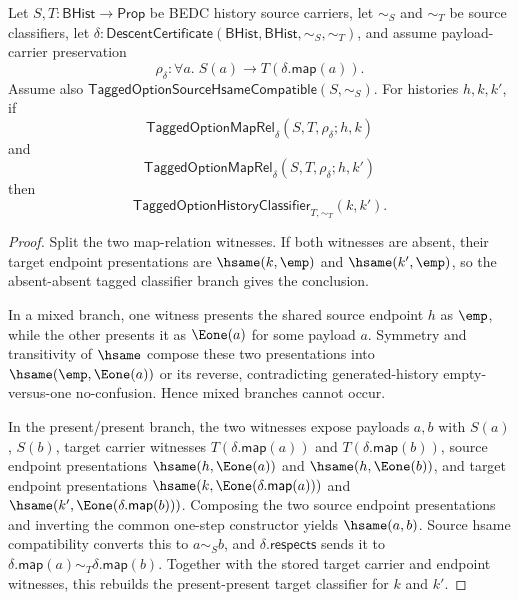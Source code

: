\begin{theorem}
\label{thm:tagged-option-maprel-common-source-target-classification}
Let $S,T:\mathsf{BHist}\to\mathsf{Prop}$ be BEDC history source carriers, let
$\sim_S$ and $\sim_T$ be source classifiers, let
$\delta:\mathsf{DescentCertificate}(\mathsf{BHist},\mathsf{BHist},\sim_S,\sim_T)$,
and assume payload-carrier preservation
$$
\rho_{\delta}:\forall a.\;S(a)\to T(\delta.\mathsf{map}(a)).
$$
Assume also $\mathsf{TaggedOptionSourceHsameCompatible}(S,\sim_S)$. For
histories $h,k,k'$, if
$$
\mathsf{TaggedOptionMapRel}_{\delta}(S,T,\rho_{\delta};h,k)
$$
and
$$
\mathsf{TaggedOptionMapRel}_{\delta}(S,T,\rho_{\delta};h,k')
$$
then
$$
\mathsf{TaggedOptionHistoryClassifier}_{T,\sim_T}(k,k').
$$
\end{theorem}
\begin{proof}
Split the two map-relation witnesses. If both witnesses are absent, their
target endpoint presentations are $\hsame(k,\emp)$ and $\hsame(k',\emp)$, so
the absent-absent tagged classifier branch gives the conclusion.

In a mixed branch, one witness presents the shared source endpoint $h$ as
$\emp$, while the other presents it as $\Eone(a)$ for some payload $a$.
Symmetry and transitivity of $\hsame$ compose these two presentations into
$\hsame(\emp,\Eone(a))$ or its reverse, contradicting generated-history
empty-versus-one no-confusion. Hence mixed branches cannot occur.

In the present/present branch, the two witnesses expose payloads $a,b$ with
$S(a)$, $S(b)$, target carrier witnesses
$T(\delta.\mathsf{map}(a))$ and $T(\delta.\mathsf{map}(b))$, source endpoint
presentations $\hsame(h,\Eone(a))$ and $\hsame(h,\Eone(b))$, and target
endpoint presentations
$\hsame(k,\Eone(\delta.\mathsf{map}(a)))$ and
$\hsame(k',\Eone(\delta.\mathsf{map}(b)))$. Composing the two source endpoint
presentations and inverting the common one-step constructor yields
$\hsame(a,b)$. Source hsame compatibility converts this to $a\sim_S b$, and
$\delta.\mathsf{respects}$ sends it to
$\delta.\mathsf{map}(a)\sim_T\delta.\mathsf{map}(b)$. Together with the stored
target carrier and endpoint witnesses, this rebuilds the present-present
target classifier for $k$ and $k'$.
\end{proof}

